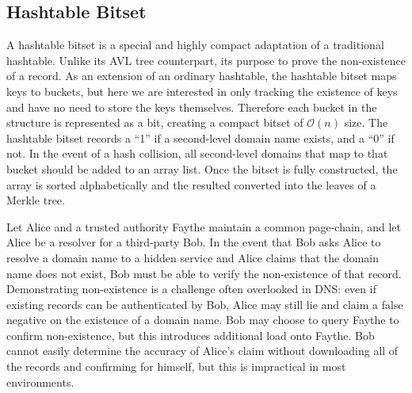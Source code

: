 



\subsection{Hashtable Bitset}

A hashtable bitset is a special and highly compact adaptation of a traditional hashtable. Unlike its AVL tree counterpart, its purpose to prove the non-existence of a record. As an extension of an ordinary hashtable, the hashtable bitset maps keys to buckets, but here we are interested in only tracking the existence of keys and have no need to store the keys themselves. Therefore each bucket in the structure is represented as a bit, creating a compact bitset of $ \mathcal{O}(n) $ size. The hashtable bitset records a ``1'' if a second-level domain name exists, and a ``0'' if not. In the event of a hash collision, all second-level domains that map to that bucket should be added to an array list. Once the bitset is fully constructed, the array is sorted alphabetically and the resulted converted into the leaves of a Merkle tree.



Let Alice and a trusted authority Faythe maintain a common page-chain, and let Alice be a resolver for a third-party Bob. In the event that Bob asks Alice to resolve a domain name to a hidden service and Alice claims that the domain name does not exist, Bob must be able to verify the non-existence of that record. Demonstrating non-existence is a challenge often overlooked in DNS: even if existing records can be authenticated by Bob, Alice may still lie and claim a false negative on the existence of a domain name. Bob may choose to query Faythe to confirm non-existence, but this introduces additional load onto Faythe. Bob cannot easily determine the accuracy of Alice's claim without downloading all of the records and confirming for himself, but this is impractical in most environments.

